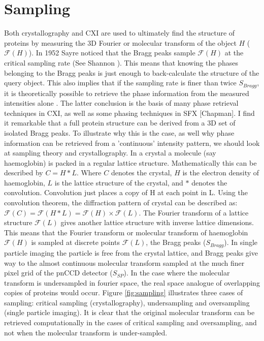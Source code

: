 \section{Sampling} 
Both crystallography and CXI are used to ultimately find the structure of proteins by measuring the 3D Fourier or molecular transform of the object $H$ ($\mathcal{F}(H)$). In 1952 Sayre noticed that the Bragg peaks sample $\mathcal{F}(H)$ at the critical sampling rate \cite{Sayre1952a} (See Shannon \cite{Shannon1949a}). This means that knowing the phases belonging to the Bragg peaks is just enough to back-calculate the structure of the query object. This also implies that if the sampling rate is finer than twice $S_{Bragg}$, it is theoretically possible to retrieve the phase information from the measured intensities alone \cite{Miao1999}. The latter conclusion is the basis of many phase retrieval techniques in CXI, as well as some phasing techniques in SFX [Chapman].
I find it remarkable that a full protein structure can be derived from a 3D set of isolated Bragg peaks. To illustrate why this is the case, as well why phase information can be retrieved from a 'continuous' intensity pattern, we should look at sampling theory and crystallography. In a crystal a molecule (say haemoglobin) is packed in a regular lattice structure. Mathematically this can be described by $C = H * L$. Where $C$ denotes the crystal, $H$ is the electron density of haemoglobin, $L$ is the lattice structure of the crystal, and $*$ denotes the convolution. Convolution just places a copy of H at each point in L. Using the convolution theorem, the diffraction pattern of crystal can be described as: $\mathcal{F}(C) = \mathcal{F}(H * L) = \mathcal{F}(H) \times \mathcal{F}(L)$. The Fourier transform of a lattice structure $\mathcal{F}(L)$ gives another lattice structure with inverse lattice dimensions. This means that the Fourier transform or molecular transform of haemoglobin $\mathcal{F}(H)$ is sampled at discrete points $\mathcal{F}(L)$, the Bragg peaks ($S_{Bragg}$). In single particle imaging the particle is free from the crystal lattice, and Bragg peaks give way to the almost continuous molecular transform sampled at the much finer pixel grid of the pnCCD detector ($S_{SP}$). In the case where the molecular transform is undersampled in fourier space, the real space analogue of overlapping copies of proteins would occur.
Figure \ref{fig:sampling} illustrates three cases of sampling: critical sampling (crystallography), undersampling and oversampling (single particle imaging). It is clear that the original molecular transform can be retrieved computationally in the cases of critical sampling and oversampling, and not when the molecular transform is under-sampled. 
